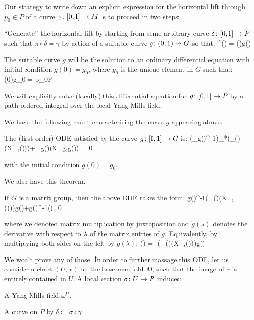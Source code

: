 Our strategy to write down an explicit expression for the horizontal lift through $p_0\in P$ of a curve $\gamma\colon
[0,1]\to M$ is to proceed in two steps:

\ben[label=\roman*)]
\item ``Generate'' the horizontal lift by starting from some arbitrary curve $\delta\colon [0,1]\to P$ such that
$\pi\circ \delta = \gamma$ by action of a suitable curve $g\colon (0,1)\to G$ so that:
\bse
\gamma^\uparrow(\lambda) = \delta(\lambda)\racts g(\lambda)
\ese

The suitable curve $g$ will be the solution to an ordinary differential equation with initial condition $g(0)=g_0$,
where $g_0$ is the unique element in $G$ such that:
\bse
\delta(0)\racts g_0 = p_0\in P
\ese

\item We will explicitly solve (locally) this differential equation for $g\colon [0,1]\to P$ by a path-ordered integral
over the local Yang-Mills field.
\een

We have the following result characterising the curve $g$ appearing above.

\bt[]
The (first order) ODE satisfied by the curve $g\colon[0,1]\to G$ is:
\bse
(\Ad_{g(\lambda)^{-1}})_*(\omega_{\delta(\lambda)}(X_{\delta,\delta(\lambda)}))+\Xi_{g(\lambda)}(X_{g,g(\lambda)}) = 0
\ese

with the initial condition $g(0)=g_0$.
\et

We also have this theorem.

\bt[]
If $G$ is a matrix group, then the above ODE takes the form:
\bse
g(\lambda)^{-1}(\omega_{\delta(\lambda)}(X_{\delta,\delta(\lambda)}))g(\lambda)+g(\lambda)^{-1}(\lambda)=0
\ese

where we denoted matrix multiplication by juxtaposition and $\dot g(\lambda) $ denotes the derivative with respect to
$\lambda$ of the matrix entries of $g$. Equivalently, by multiplying both sides on the left by $g(\lambda)$:
\bse
{}(\lambda) = -(\omega_{\delta(\lambda)}(X_{\delta,\delta(\lambda)}))g(\lambda)
\ese
\et

We won't prove any of those. \v

In order to further massage this ODE, let us consider a chart $(U,x)$ on the base manifold $M$, such that the image
of $\gamma$ is entirely contained in $U$. A local section $\sigma\colon U \to P$ induces:
\ben[label=\roman*)]
\item A Yang-Mills field $\omega^U$.
\item A curve on $P$ by $\delta \coloneqq \sigma \circ \gamma$
\een

